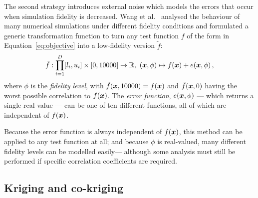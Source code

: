 The second strategy introduces external noise which models the errors that occur when simulation fidelity is decreased. Wang et al.~\cite{wang2017generic} analysed the behaviour of many numerical simulations under different fidelity conditions and 
formulated a generic transformation function to turn any test function $f$ of the form in Equation~\ref{eq:objective} into a low-fidelity version $\tilde f$:
\begin{equation}
\tilde f: \displaystyle\prod^D_{i=1}[l_i,u_i] \times [0,10000] \to \mathbb{R},\ (\V{x},\phi) \mapsto f(\V{x}) + e(\V{x},\phi)\,,\label{eq:error-fn}
\end{equation}
where $\phi$ is the \emph{fidelity level}, with $\tilde f(\boldsymbol{x},10000) = f(\boldsymbol{x})$ and $\tilde f(\boldsymbol{x},0)$ having the worst possible correlation to $f(\boldsymbol{x})$. The \emph{error function}, $e(\boldsymbol{x},\phi)$ --- which returns a single real value --- can be one of ten different functions, all of which are independent of $f(\boldsymbol{x})$.

Because the error function is always independent of $f(\boldsymbol{x})$, this method can be applied to any test function at all; and because $\phi$ is real-valued, many different fidelity levels can be modelled easily--- although some analysis must still be performed if specific correlation coefficients are required.

\subsection{Kriging and co-kriging}

